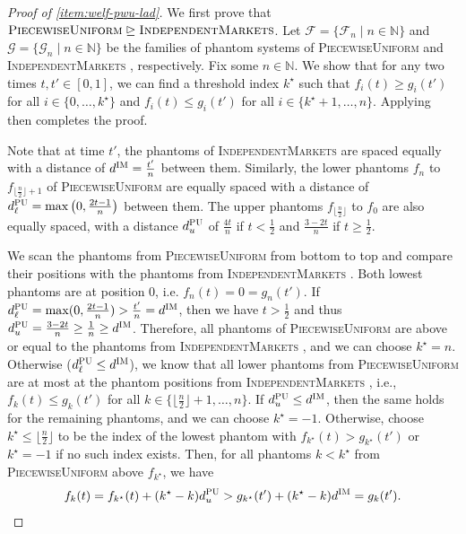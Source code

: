 \documentclass[11pt]{article}
\newcommand{\F}{\mathcal{F}}
\newcommand{\G}{\mathcal{G}}
\newcommand{\N}{\mathbb{N}}
\newcommand{\IM}{\textsc{IndependentMarkets} }
\newcommand{\IMs}{\textsc{IM} }
\newcommand{\PiecewiseUniform}{\textsc{PiecewiseUniform} }
\newcommand{\PiecewiseUniforms}{\textsc{PU} }
\begin{document}
\begin{proof}[Proof of  \textnormal{\ref{item:welf-pwu-lad}}]
    We first prove that $\PiecewiseUniform \trianglerighteq \IM$. 
    Let $\F = \{\F_n \mid n \in \N\}$ and $\G = \{\G_n \mid n \in \N\}$ be the families of phantom systems of \PiecewiseUniform and \IM, respectively. Fix some $n \in \N$. We show that for any two times $t, t' \in [0,1]$, we can find a threshold index $k^\star$ such that $f_i(t) \ge g_i(t')$ for all $i \in \{0, \dots, k^\star\}$ and $f_i(t) \le g_i(t')$ for all $i \in \{k^\star+1, \dots, n\}$.
    Applying  then completes the proof.

    Note that at time $t'$, the phantoms of \IM are spaced equally with a distance of $d^\IMs = \frac{t'}{n}$ between them. Similarly, the lower phantoms $f_n$ to $f_{\lfloor \frac{n}{2} \rfloor + 1}$ of \PiecewiseUniform  are equally spaced with a distance of $d^\PiecewiseUniforms_\ell = \max
    \big(0, \frac{2t-1}{n}\big)$ between them. The upper phantoms $f_{\lfloor \frac{n}{2} \rfloor}$ to $f_0$ are also equally spaced, with a distance $d^\PiecewiseUniforms_u$ of $\frac{4t}{n}$ if $t < \frac{1}{2}$ and $\frac{3-2t}{n}$ if $t \ge \frac{1}{2}$.

    We scan the phantoms from \PiecewiseUniform from bottom to top and compare their positions with the phantoms from \IM. Both lowest phantoms are at position $0$, i.e. $f_n(t) = 0  = g_n(t')$. If $d^\PiecewiseUniforms_\ell = \max(0, \frac{2t-1}{n}) > \frac{t'}{n} = d^\IMs$, then we have $t > \frac{1}{2}$ and thus $d^\PiecewiseUniforms_u = \frac{3-2t}{n} \ge \frac{1}{n} \ge d^\IMs$. Therefore, all phantoms of \PiecewiseUniform are above or equal to the phantoms from \IM, and we can choose $k^\star = n$.
    Otherwise ($d^\PiecewiseUniforms_\ell \le d^\IMs$), we know that all lower phantoms from \PiecewiseUniform are at most at the phantom positions from \IM, i.e., $f_k(t) \le g_k(t')$ for all $k \in \{\lfloor \frac{n}{2} \rfloor + 1, \dots, n\}$. 
    If $d^\PiecewiseUniforms_u \le d^\IMs$, then the same holds for the remaining phantoms, and we can choose $k^\star = -1$. Otherwise, choose $k^\star \le \lfloor \frac{n}{2} \rfloor$ to be the index of the lowest phantom with $f_{k^\star}(t) > g_{k^\star}(t')$ or $k^\star = -1$ if no such index exists. Then, for all phantoms $k < k^\star$ from \PiecewiseUniform above $f_{k^\star}$, we have 
    $$
        f_{k}(t) = f_{k^\star}(t) + (k^\star-k) d^\PiecewiseUniforms_u > g_{k^\star}(t') + (k^\star-k) d^\IMs = g_{k}(t').
    $$


\end{proof}
\end{document}
